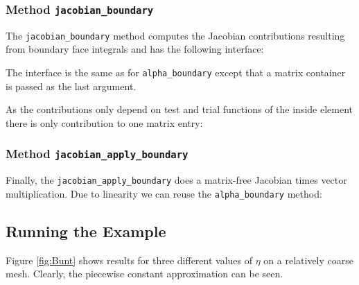 \documentclass[a4paper,12pt]{article}
\begin{document}
\subsubsection*{Method \lstinline{jacobian_boundary}}

The \lstinline{jacobian_boundary} method computes
the Jacobian contributions resulting from boundary face integrals
and has the following interface:

The interface is the same as for \lstinline{alpha_boundary} except that
a matrix container is passed as the last argument.

As the contributions only depend on test and trial functions
of the inside element there is only contribution to one
matrix entry:


\subsubsection*{Method \lstinline{jacobian_apply_boundary}}

Finally, the \lstinline{jacobian_apply_boundary} does a
matrix-free Jacobian times vector multiplication. Due to linearity
we can reuse the \lstinline{alpha_boundary} method:


\subsection{Running the Example}

Figure \ref{fig:Bunt} shows results for three different values of $\eta$ on a relatively
coarse mesh. Clearly, the piecewise constant approximation can be seen.
\end{document}
